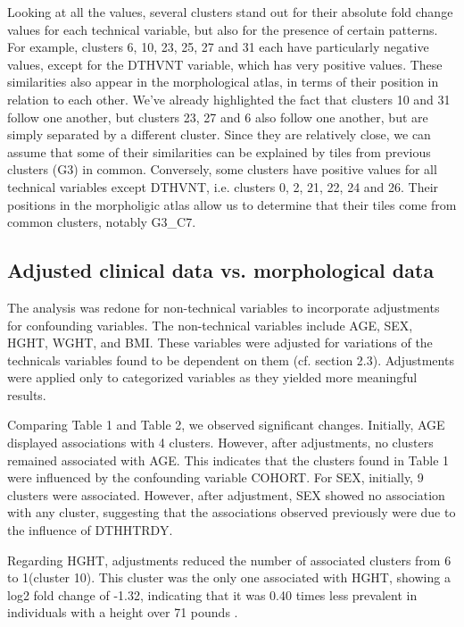 \documentclass[a4paper, 11pt]{article}
\begin{document}
\begin{multicols}{2}
Looking at all the values, several clusters stand out for their absolute fold change values for each technical variable, but also for the presence of certain patterns. For example, clusters 6, 10, 23, 25, 27 and 31 each have particularly negative values, except for the DTHVNT variable, which has very positive values. These similarities also appear in the morphological atlas, in terms of their position in relation to each other. We've already highlighted the fact that clusters 10 and 31 follow one another, but clusters 23, 27 and 6 also follow one another, but are simply separated by a different cluster. Since they are relatively close, we can assume that some of their similarities can be explained by tiles from previous clusters (G3) in common. Conversely, some clusters have positive values for all technical variables except DTHVNT, i.e. clusters 0, 2, 21, 22, 24 and 26. Their positions in the morpholigic atlas allow us to determine that their tiles come from common clusters, notably G3\_C7.

\subsection{Adjusted clinical data vs. morphological data}

The analysis was redone for non-technical variables to incorporate adjustments for confounding variables. The non-technical variables include AGE, SEX, HGHT, WGHT, and BMI. These variables were adjusted for variations  of the technicals variables found to be dependent on them (cf. section 2.3). 
Adjustments were applied only to categorized variables as they yielded more meaningful results.

Comparing Table 1 and Table 2, we observed significant changes. Initially, AGE displayed associations with 4 clusters. However, after adjustments, no clusters remained associated with AGE. This indicates that the clusters found in Table 1 were influenced by the confounding variable COHORT.
For SEX, initially, 9 clusters were associated. However, after adjustment, SEX showed no association with any cluster, suggesting that the associations observed previously were due to the influence of DTHHTRDY.

Regarding HGHT, adjustments reduced the number of associated clusters from 6 to 1(cluster 10). This cluster was the only one associated with HGHT, showing a log2 fold change of -1.32, indicating that it was 0.40 times less prevalent in individuals with a height over 71 pounds . 


\end{multicols}
\end{document}
